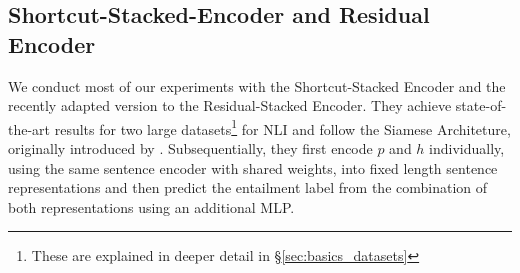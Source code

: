 \subsection{Shortcut-Stacked-Encoder and Residual Encoder}\label{sec:residual_encoder_def}
We conduct most of our experiments with the Shortcut-Stacked Encoder \citep{nie2017shortcut} and the recently adapted version to the Residual-Stacked Encoder. They achieve state-of-the-art results for two large datasets\footnote{These are explained in deeper detail in §\ref{sec:basics_datasets}} for \ac{NLI} and follow the Siamese Architeture, originally introduced by \cite{bromley1994signature}. Subsequentially, they first encode $p$ and $h$ individually, using the same sentence encoder with shared weights, into fixed length sentence representations and then predict the entailment label from the combination of both representations using an additional \ac{MLP}.

